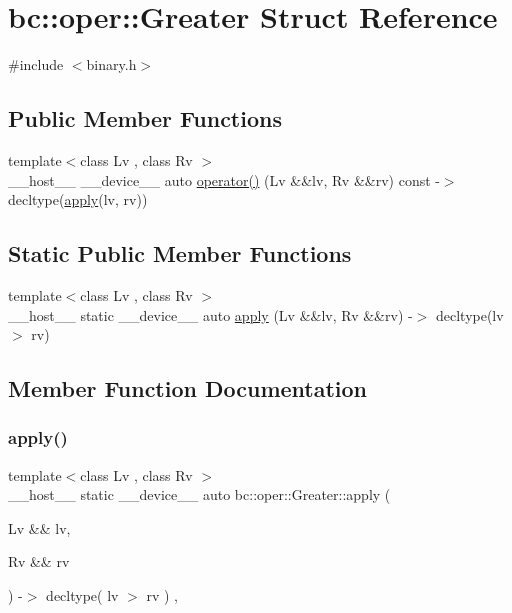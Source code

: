 \hypertarget{structbc_1_1oper_1_1Greater}{}\section{bc\+:\+:oper\+:\+:Greater Struct Reference}
\label{structbc_1_1oper_1_1Greater}


{\ttfamily \#include $<$binary.\+h$>$}

\subsection*{Public Member Functions}
\begin{DoxyCompactItemize}
\item 
{\footnotesize template$<$class Lv , class Rv $>$ }\\\+\_\+\+\_\+host\+\_\+\+\_\+ \+\_\+\+\_\+device\+\_\+\+\_\+ auto \hyperlink{structbc_1_1oper_1_1Greater_a4da11daf25c285a0bb900c20cc586f2d}{operator()} (Lv \&\&lv, Rv \&\&rv) const -\/$>$ decltype(\hyperlink{structbc_1_1oper_1_1Greater_af110c0e66f662db92a4aa14e27b94876}{apply}(lv, rv))
\end{DoxyCompactItemize}
\subsection*{Static Public Member Functions}
\begin{DoxyCompactItemize}
\item 
{\footnotesize template$<$class Lv , class Rv $>$ }\\\+\_\+\+\_\+host\+\_\+\+\_\+ static \+\_\+\+\_\+device\+\_\+\+\_\+ auto \hyperlink{structbc_1_1oper_1_1Greater_af110c0e66f662db92a4aa14e27b94876}{apply} (Lv \&\&lv, Rv \&\&rv) -\/$>$ decltype(lv $>$ rv)
\end{DoxyCompactItemize}


\subsection{Member Function Documentation}
\mbox{\label{structbc_1_1oper_1_1Greater_af110c0e66f662db92a4aa14e27b94876}} 
\subsubsection{\texorpdfstring{apply()}{apply()}}
{\footnotesize\ttfamily template$<$class Lv , class Rv $>$ \\
\+\_\+\+\_\+host\+\_\+\+\_\+ static \+\_\+\+\_\+device\+\_\+\+\_\+ auto bc\+::oper\+::\+Greater\+::apply (\begin{DoxyParamCaption}\item[{Lv \&\&}]{lv,  }\item[{Rv \&\&}]{rv }\end{DoxyParamCaption}) -\/$>$ decltype( lv $>$ rv ) \hspace{0.3cm}{\ttfamily [inline]}, {\ttfamily [static]}}

